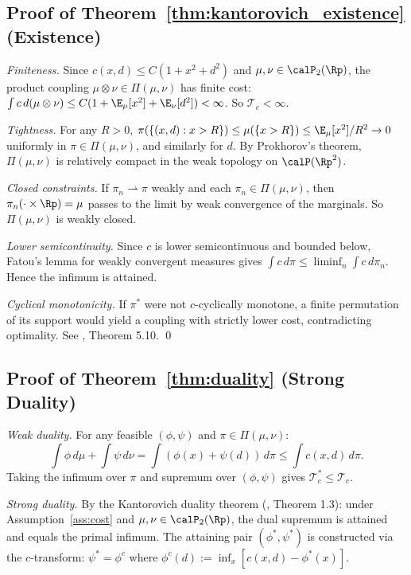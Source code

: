 \subsection*{Proof of Theorem~\ref{thm:kantorovich_existence} (Existence)}

\emph{Finiteness.} Since $c(x,d) \leq C(1+x^2+d^2)$ and $\mu,\nu \in \calP_2(\Rp)$, the product coupling $\mu \otimes \nu \in \Pi(\mu,\nu)$ has finite cost: $\int c\,d(\mu\otimes\nu) \leq C(1+\E_\mu[x^2]+\E_\nu[d^2]) < \infty$. So $\mathcal{T}_c < \infty$.

\emph{Tightness.} For any $R > 0$, $\pi(\{(x,d): x > R\}) \leq \mu(\{x>R\}) \leq \E_\mu[x^2]/R^2 \to 0$ uniformly in $\pi \in \Pi(\mu,\nu)$, and similarly for $d$. By Prokhorov's theorem, $\Pi(\mu,\nu)$ is relatively compact in the weak topology on $\calP(\Rp^2)$.

\emph{Closed constraints.} If $\pi_n \rightharpoonup \pi$ weakly and each $\pi_n \in \Pi(\mu,\nu)$, then $\pi_n(\cdot \times \Rp) = \mu$ passes to the limit by weak convergence of the marginals. So $\Pi(\mu,\nu)$ is weakly closed.

\emph{Lower semicontinuity.} Since $c$ is lower semicontinuous and bounded below, Fatou's lemma for weakly convergent measures gives $\int c\,d\pi \leq \liminf_n \int c\,d\pi_n$. Hence the infimum is attained.

\emph{Cyclical monotonicity.} If $\pi^*$ were not $c$-cyclically monotone, a finite permutation of its support would yield a coupling with strictly lower cost, contradicting optimality. See \citet{villani2003topics}, Theorem 5.10. \qed

\subsection*{Proof of Theorem~\ref{thm:duality} (Strong Duality)}

\emph{Weak duality.} For any feasible $(\phi,\psi)$ and $\pi \in \Pi(\mu,\nu)$:
\[
  \int \phi\,d\mu + \int \psi\,d\nu = \int (\phi(x)+\psi(d))\,d\pi \leq \int c(x,d)\,d\pi.
\]
Taking the infimum over $\pi$ and supremum over $(\phi,\psi)$ gives $\mathcal{T}_c^* \leq \mathcal{T}_c$.

\emph{Strong duality.} By the Kantorovich duality theorem (\citet{villani2003topics}, Theorem 1.3): under Assumption~\ref{ass:cost} and $\mu,\nu \in \calP_2(\Rp)$, the dual supremum is attained and equals the primal infimum. The attaining pair $(\phi^*,\psi^*)$ is constructed via the $c$-transform: $\psi^* = \phi^{c}$ where $\phi^c(d) := \inf_x [c(x,d)-\phi^*(x)]$.

